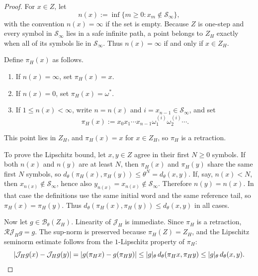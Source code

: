 \begin{proof}
For \(x\in Z\), let
\[
  n(x):=\inf\{m\geq0:x_m\notin\mathcal S_\infty\},
\]
with the convention \(n(x)=\infty\) if the set is empty.  Because \(Z\)
is one-step and every symbol in \(\mathcal S_\infty\) lies in a safe
infinite path, a point belongs to \(Z_H\) exactly when all of its
symbols lie in \(\mathcal S_\infty\).  Thus \(n(x)=\infty\) if and only
if \(x\in Z_H\).

Define \(\pi_H(x)\) as follows.
\begin{enumerate}[label=(\roman*)]
  \item If \(n(x)=\infty\), set \(\pi_H(x)=x\).
  \item If \(n(x)=0\), set \(\pi_H(x)=\omega^\ast\).
  \item If \(1\leq n(x)<\infty\), write \(n=n(x)\) and
  \(i=x_{n-1}\in\mathcal S_\infty\), and set
  \[
    \pi_H(x):=
    x_0x_1\cdots x_{n-1}\omega^{(i)}_1\omega^{(i)}_2\cdots .
  \]
\end{enumerate}
This point lies in \(Z_H\), and \(\pi_H(x)=x\) for \(x\in Z_H\), so
\(\pi_H\) is a retraction.

To prove the Lipschitz bound, let \(x,y\in Z\) agree in their first
\(N\geq0\) symbols.  If both \(n(x)\) and \(n(y)\) are at least \(N\),
then \(\pi_H(x)\) and \(\pi_H(y)\) share the same first \(N\) symbols,
so \(d_\theta(\pi_H(x),\pi_H(y))\leq\theta^N=d_\theta(x,y)\).  If, say,
\(n(x)<N\), then \(x_{n(x)}\notin\mathcal S_\infty\), hence also
\(y_{n(x)}=x_{n(x)}\notin\mathcal S_\infty\).  Therefore
\(n(y)=n(x)\).  In that case the definitions use the same initial word
and the same reference tail, so \(\pi_H(x)=\pi_H(y)\).  Thus
\(d_\theta(\pi_H(x),\pi_H(y))\leq d_\theta(x,y)\) in all cases.

Now let \(g\in\mathcal B_\theta(Z_H)\).  Linearity of \(\mathcal J_H\)
is immediate.  Since \(\pi_H\) is a retraction,
\(\mathcal R\mathcal J_H g=g\).  The sup-norm is preserved because
\(\pi_H(Z)=Z_H\), and the Lipschitz seminorm estimate follows from the
\(1\)-Lipschitz property of \(\pi_H\):
\[
  \lvert \mathcal J_H g(x)-\mathcal J_H g(y)\rvert
  =
  \lvert g(\pi_Hx)-g(\pi_Hy)\rvert
  \leq
  \lvert g\rvert_\theta\,d_\theta(\pi_Hx,\pi_Hy)
  \leq
  \lvert g\rvert_\theta\,d_\theta(x,y).
\]
\end{proof}

